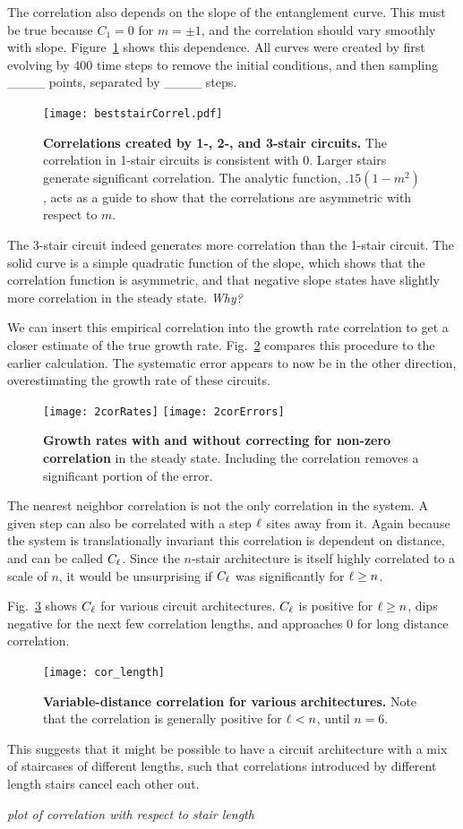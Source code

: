 The correlation also depends on the slope of the entanglement curve. This must be true because $C_1=0$ for $m=\pm1$, and the correlation should vary smoothly with slope. Figure~\ref{fig:steadystate} shows this dependence. All curves were created by first evolving by 400 time steps to remove the initial conditions, and then sampling \_\_\_\_ points, separated by \_\_\_\_ steps.
\begin{figure}
	\centering
	\texttt{[image: beststairCorrel.pdf]}
	\caption{\textbf{Correlations created by 1-, 2-, and 3-stair circuits.} The correlation in 1-stair circuits is consistent with 0. Larger stairs generate significant correlation. The analytic function, $.15(1-m^2)$, acts as a guide to show that the correlations are asymmetric with respect to $m$.}
	\label{fig:steadystate}
\end{figure}

The 3-stair circuit indeed generates more correlation than the 1-stair circuit. The solid curve is a simple quadratic function of the slope, which shows that the correlation function is asymmetric, and that negative slope states have slightly more correlation in the steady state. \emph{Why?}

We can insert this empirical correlation into the growth rate correlation to get a closer estimate of the true growth rate. Fig.~\ref{fig:2corRates} compares this procedure to the earlier calculation. The systematic error appears to now be in the other direction, overestimating the growth rate of these circuits.
\begin{figure}
	\centering
	\texttt{[image: 2corRates]}
	\texttt{[image: 2corErrors]}
	\caption{\textbf{Growth rates with and without correcting for non-zero correlation} in the steady state. Including the correlation removes a significant portion of the error.}
	\label{fig:2corRates}
\end{figure}

The nearest neighbor correlation is not the only correlation in the system. A given step can also be correlated with a step $\ell$ sites away from it. Again because the system is translationally invariant this correlation is dependent on distance, and can be called $C_\ell$. Since the $n$-stair architecture is itself highly correlated to a scale of $n$, it would be unsurprising if $C_\ell$ was significantly for $\ell\ge n$. 

Fig.~\ref{fig:cor_length} shows $C_\ell$ for various circuit architectures. $C_\ell$ is positive for $\ell\ge n$, dips negative for the next few correlation lengths, and approaches 0 for long distance correlation.
\begin{figure}
	\centering
	\texttt{[image: cor\_length]}
	\caption{\textbf{Variable-distance correlation for various architectures.} Note that the correlation is generally positive for $\ell<n$, until $n=6$.}
	\label{fig:cor_length}
\end{figure}
This suggests that it might be possible to have a circuit architecture with a mix of staircases of different lengths, such that correlations introduced by different length stairs cancel each other out.

\emph{plot of correlation with respect to stair length}